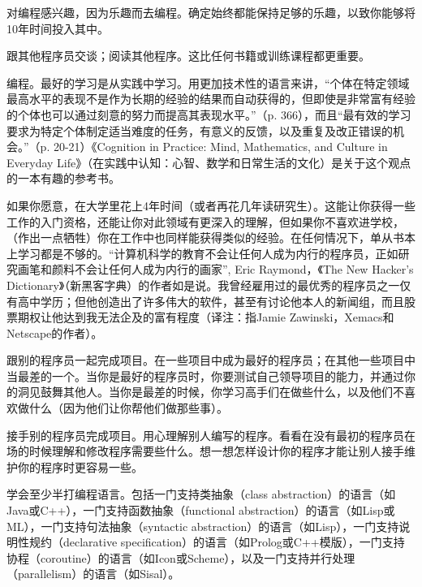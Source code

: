 \begin{compactitem}
\item 对编程感兴趣，因为乐趣而去编程。确定始终都能保持足够的乐趣，以致你能够将10年时间投入其中。

\item 跟其他程序员交谈；阅读其他程序。这比任何书籍或训练课程都更重要。

\item 编程。最好的学习是从实践中学习。用更加技术性的语言来讲，“个体在特定领域最高水平的表现不是作为长期的经验的结果而自动获得的，但即使是非常富有经验的个体也可以通过刻意的努力而提高其表现水平。”（p. 366），而且“最有效的学习要求为特定个体制定适当难度的任务，有意义的反馈，以及重复及改正错误的机会。”（p. 20-21）《Cognition in Practice: Mind, Mathematics, and Culture in Everyday Life》（在实践中认知：心智、数学和日常生活的文化）是关于这个观点的一本有趣的参考书。

\item 如果你愿意，在大学里花上4年时间（或者再花几年读研究生）。这能让你获得一些工作的入门资格，还能让你对此领域有更深入的理解，但如果你不喜欢进学校，（作出一点牺牲）你在工作中也同样能获得类似的经验。在任何情况下，单从书本上学习都是不够的。“计算机科学的教育不会让任何人成为内行的程序员，正如研究画笔和颜料不会让任何人成为内行的画家”, Eric Raymond，《The New Hacker's Dictionary》（新黑客字典）的作者如是说。我曾经雇用过的最优秀的程序员之一仅有高中学历；但他创造出了许多伟大的软件，甚至有讨论他本人的新闻组，而且股票期权让他达到我无法企及的富有程度（译注：指Jamie Zawinski，Xemacs和Netscape的作者）。

\item 跟别的程序员一起完成项目。在一些项目中成为最好的程序员；在其他一些项目中当最差的一个。当你是最好的程序员时，你要测试自己领导项目的能力，并通过你的洞见鼓舞其他人。当你是最差的时候，你学习高手们在做些什么，以及他们不喜欢做什么（因为他们让你帮他们做那些事）。

\item 接手别的程序员完成项目。用心理解别人编写的程序。看看在没有最初的程序员在场的时候理解和修改程序需要些什么。想一想怎样设计你的程序才能让别人接手维护你的程序时更容易一些。

\item 学会至少半打编程语言。包括一门支持类抽象（class abstraction）的语言（如Java或C++），一门支持函数抽象（functional abstraction）的语言（如Lisp或ML），一门支持句法抽象（syntactic abstraction）的语言（如Lisp），一门支持说明性规约（declarative specification）的语言（如Prolog或C++模版），一门支持协程（coroutine）的语言（如Icon或Scheme），以及一门支持并行处理（parallelism）的语言（如Sisal）。


\end{compactitem}
